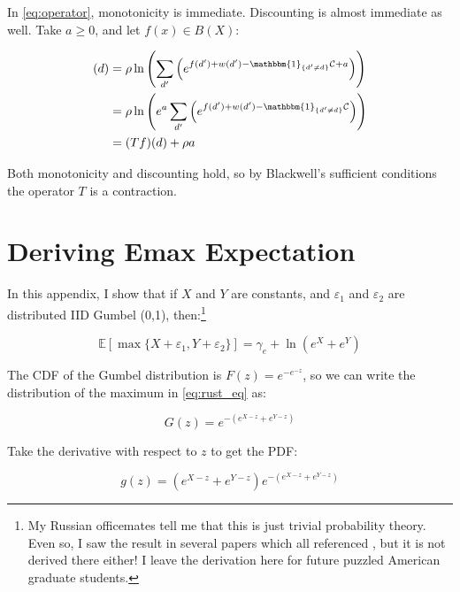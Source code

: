 In \eqref{eq:operator}, monotonicity is immediate.  Discounting is almost
immediate as well. Take $a \geq 0$, and let $f(x) \in B(X)$:

\begin{align}
    [T(f + a)](d) &= \rho \ln \left( \sum_{d'} \left(e^{f(d') + w(d') - \mathbbm{1}_{\{d'\neq d\}}\mathcal{C} + a}\right)\right) \nonumber \\
    &= \rho \ln \left( e^a \sum_{d'} \left(e^{f(d') + w(d') - \mathbbm{1}_{\{d'\neq d\}}\mathcal{C}}\right)\right) \nonumber \\
    &= (Tf)(d) + \rho a \nonumber \\
\end{align}

Both monotonicity and discounting hold, so by Blackwell's sufficient conditions the operator $T$ is a contraction.

\clearpage
\section{Deriving Emax Expectation}
\label{sec:exp_der}

In this appendix, I show that if $X$ and $Y$ are constants, and $\varepsilon_1$ and $\varepsilon_2$ are distributed IID Gumbel (0,1), then:\footnote{My Russian officemates tell me that this is just trivial probability theory.  Even so, I saw the result in several papers which all referenced \citet{rust1987optimal}, but it is not derived there either!  I leave the derivation here for future puzzled American graduate students.}

\begin{equation}
    \mathbb{E} \left[\max\{X + \varepsilon_1, Y + \varepsilon_2\}\right] = \gamma_e + \ln \left(e^{X} + e^{Y}\right)
    \label{eq:rust_eq}
\end{equation}

The CDF of the Gumbel distribution is $F(z) = e^{-e^{-z}}$, so we can write the distribution of the maximum in \eqref{eq:rust_eq} as:

\begin{equation}
    G(z) = e^{-\left(e^{X - z} + e^{Y - z}\right)}
\end{equation}

Take the derivative with respect to $z$ to get the PDF:

\begin{equation}
    g(z) = \left(e^{X - z} + e^{Y - z}\right) e^{-\left(e^{X - z} + e^{Y - z}\right)}
\end{equation}

